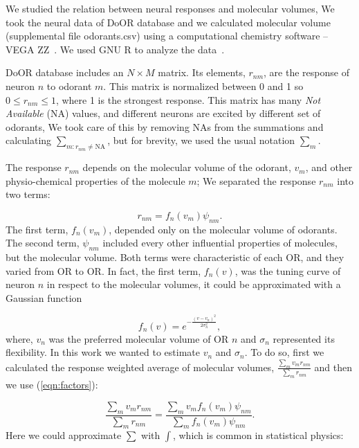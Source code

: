 \documentclass[11pt]{paper} %
\begin{document}
We studied the relation between neural responses and molecular volumes, 
We took the neural data of DoOR database \cite{Galizia2010} and we calculated molecular volume (supplemental file odorants.csv) using a computational chemistry software -- VEGA ZZ~\cite{Pedretti2004}. 
We used  GNU R to analyze the data~\cite{Rlanguage}.

DoOR database includes an $N\times M$ matrix. 
Its elements, $r_{nm}$, are the response of neuron $n$ to odorant $m$. 
This matrix is normalized between 0 and 1 so $0 \le r_{nm} \le 1$, where 1 is the strongest response.
This matrix has many {\it Not Available} (NA) values, 
and different neurons are excited by different set of odorants, 
We took care of this by removing NAs from the summations and calculating $\sum_{m: r_{nm} \neq \text{NA}}$, 
but for brevity, we used the usual notation $\sum_m$.

The response $r_{nm}$ depends on the molecular volume of the odorant, $v_m$, 
and other physio-chemical properties of the molecule $m$; 
We separated the response $r_{nm}$ into two terms:

\begin{equation}
	r_{nm} = f_n(v_m) \psi_{nm}.
	\label{eqn:factors}
\end{equation}
The first term, $f_n(v_m)$, depended only on the molecular volume of odorants.
The second term, $\psi_{nm}$ included every other influential properties of molecules, but the molecular volume.
Both terms were characteristic of each OR, and they varied from OR to OR.
In fact, the first term, $f_n(v)$, was the tuning curve of neuron $n$ in respect to the molecular volumes, 
it could be approximated with a Gaussian function

\begin{equation}
	\displaystyle f_n(v) = e^{-\frac{(v-v_n)^2}{2\sigma^2_n}}, 
	\label{eqn:volume-dependence}
\end{equation}
where, $v_n$ was the preferred molecular volume of OR $n$ and $\sigma_n$ represented its flexibility. 
In this work we wanted to estimate $v_n$ and $\sigma_n$. 
To do so, first we calculated the response weighted average of molecular volumes, 
$\frac{\sum_{m} v_m r_{nm}}{\sum_{m} r_{nm}}$ and then we use (\ref{eqn:factors}):

\begin{equation}
	\frac{\displaystyle \sum_{m} v_m r_{nm}}{\displaystyle \sum_{m} r_{nm}} = \frac{\displaystyle \sum_{m} v_m f_n(v_m) \psi_{nm}}{\displaystyle \sum_{m} f_n(v_m) \psi_{nm}}.
	\label{eqn:sta}
\end{equation}
Here we could approximate $\sum$ with $\int$, which is common in statistical physics:
\end{document}
